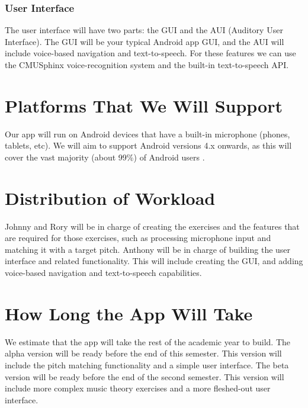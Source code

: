 \documentclass{article}
\begin{document}
\subsubsection{User Interface}
The user interface will have two parts: the GUI and the AUI (Auditory User Interface). The GUI will be your typical Android app GUI, and the AUI will include voice-based navigation and text-to-speech. For these features we can use the CMUSphinx voice-recognition system and the built-in text-to-speech API.

\section{Platforms That We Will Support}
Our app will run on Android devices that have a built-in microphone (phones, tablets, etc). We will aim to support Android versions 4.x onwards, as this will cover the vast majority (about 99\%) of Android users \cite{googledevelopers}. 

\section{Distribution of Workload}
Johnny and Rory will be in charge of creating the exercises and the features that are required for those exercises, such as processing microphone input and matching it with a target pitch. Anthony will be in charge of building the user interface and related functionality. This will include creating the GUI, and adding voice-based navigation and text-to-speech capabilities.

\section{How Long the App Will Take}
We estimate that the app will take the rest of the academic year to build. The alpha version will be ready before the end of this semester. This version will include the pitch matching functionality and a simple user interface. The beta version will be ready before the end of the second semester. This version will include more complex music theory exercises and a more fleshed-out user interface.
\end{document}
